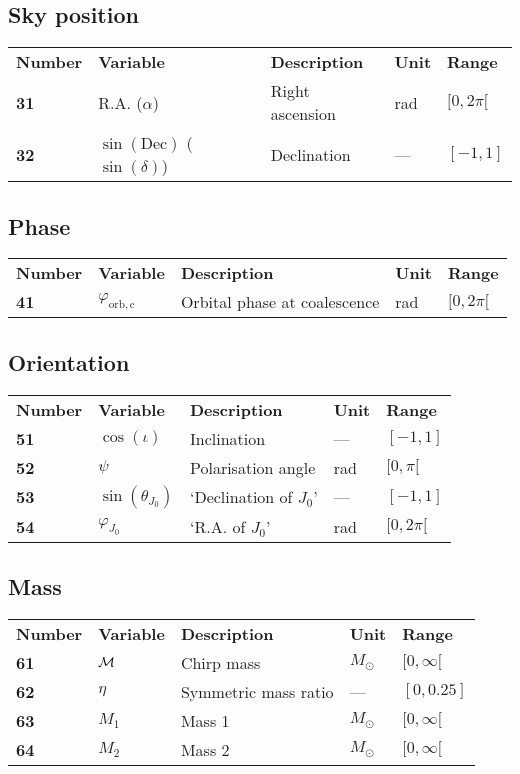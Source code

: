 \documentclass[10pt]{article}
\begin{document}
\subsection{Sky position}
\begin{tabular}{lllll}
  \textbf{Number} & \textbf{Variable} & \textbf{Description} & \textbf{Unit} & \textbf{Range} \\
  \textbf{31} & R.A. ($\alpha$)  & Right ascension & rad & $[0,2\pi[$ \\
  \textbf{32} & $\sin(\mathrm{Dec})$ ($\sin(\delta)$)  & Declination & --- & $[-1,1]$ \\
\end{tabular}


\subsection{Phase}
\begin{tabular}{lllll}
  \textbf{Number} & \textbf{Variable} & \textbf{Description} & \textbf{Unit} & \textbf{Range} \\
  \textbf{41} & $\varphi_\mathrm{orb,c}$  & Orbital phase at coalescence & rad & $[0,2\pi[$ \\
\end{tabular}

\subsection{Orientation}
\begin{tabular}{lllll}
  \textbf{Number} & \textbf{Variable} & \textbf{Description} & \textbf{Unit} & \textbf{Range} \\
  \textbf{51} & $\cos(\iota)$  & Inclination & --- & $[-1,1]$ \\
  \textbf{52} & $\psi$  & Polarisation angle & rad & $[0,\pi[$ \\
  \textbf{53} & $\sin(\theta_{J_0})$ & `Declination of $J_0$' & --- & $[-1,1]$ \\
  \textbf{54} & $\varphi_{J_0}$  & `R.A. of $J_0$' & rad & $[0,2\pi[$ \\
\end{tabular}

\subsection{Mass}
\begin{tabular}{lllll}
  \textbf{Number} & \textbf{Variable} & \textbf{Description} & \textbf{Unit} & \textbf{Range} \\
  \textbf{61} & $\cal{M}$  & Chirp mass & $M_\odot$ & $[0,\infty[$ \\
  \textbf{62} & $\eta$  & Symmetric mass ratio & --- & $[0,0.25]$ \\
  \textbf{63} & $M_1$  & Mass 1 & $M_\odot$ & $[0,\infty[$ \\
  \textbf{64} & $M_2$  & Mass 2 & $M_\odot$ &  $[0,\infty[$ \\
\end{tabular}
\end{document}
